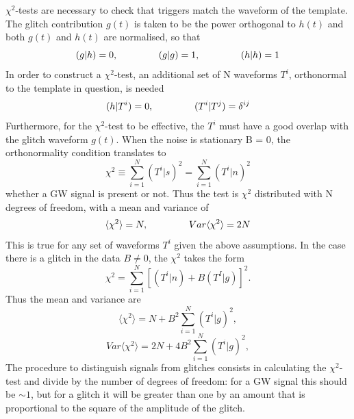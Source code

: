 \documentclass[binding=0.6cm, LaM]{sapthesis}
\begin{document}
	$\chi^2$-tests are necessary to check that triggers match the waveform of the  template.
	The glitch contribution $g(t)$ is taken to be the power orthogonal to $h(t)$ 
	and both $g(t)$ and $h(t)$ are normalised, so that 
        \begin{equation}
          (g|h)=0, \hspace*{1.5cm} (g|g)=1, \hspace*{1.5cm} (h|h)=1
        \end{equation}
	In order to construct a $\chi^2$-test, an additional set of N waveforms $T^i$, 
	orthonormal to the template in question, is needed 
        \begin{equation}
          (h|T^i)=0,  \hspace*{1.5cm} (T^i|T^j)=\delta^{ij}
        \end{equation}
	Furthermore, for the $\chi^2$-test to be effective, 
	the $T^i$ must have a good overlap with the glitch waveform $g(t)$.
	When the noise is stationary B = 0, the orthonormality condition translates to 
        \begin{equation}
          \chi^2 \equiv \sum^N_{i=1}(T^i|s)^2 =\sum^{N}_{i=1}(T^i|n)^2
        \end{equation}
	whether a GW signal is present or not. 
	Thus the test is $\chi^2$ distributed with N degrees of freedom, 
	with a mean and variance of 
        \begin{equation}
          \langle \chi^2 \rangle = N, \hspace*{1.5cm} Var\langle \chi^2 \rangle=2N
        \end{equation}
	This is true for any set of waveforms $T^i$ given the above assumptions. 
	In the case there is a  glitch in the data $B \neq 0$, the $\chi^2$ takes the form
        \begin{equation}
          \chi^2 =  \sum^N_{i=1}[(T^i|n) + B(T^I|g)]^2.
        \end{equation}
	Thus the mean and variance are 
        \begin{equation}
          \langle \chi^2 \rangle = N+ B^2\sum^N_{i=1}(T^i|g)^2, 
        \end{equation}
        \begin{equation}
          Var\langle \chi^2 \rangle=2N+ 4B^2\sum^N_{i=1}(T^i|g)^2, 
        \end{equation}
	The procedure to distinguish signals from glitches consists in calculating the $\chi^2$-test 
	and divide by the number of degrees of freedom: for a GW signal this should be $\sim 1$, 
	but for a glitch it will be greater than one by an amount that is proportional to the square of the amplitude of the glitch.
\end{document}
